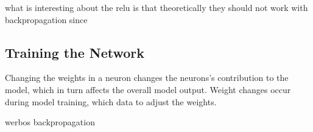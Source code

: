  

what is interesting about the relu is that theoretically they should not work with backpropagation since 



\subsection{Training the Network} \label{sec:networktraining}
Changing the weights in a neuron changes the neurons’s contribution to the model, which in turn affects the overall model output. Weight changes occur during model training, which data to adjust the weights.

werbos backpropagation